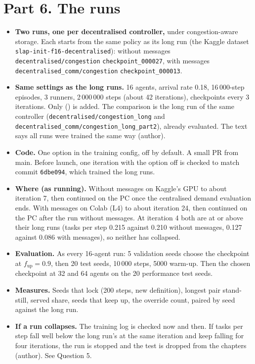 \documentclass[11pt,a4paper]{article}
\newcommand{\lab}[1]{\textsf{\footnotesize\detokenize{#1}}}
\renewcommand{\eqref}[1]{(\lab{#1})}
\begin{document}
\section*{Part 6. The runs}
\begin{itemize}[nosep]
  \item \textbf{Two runs, one per decentralised controller,} under
    congestion-aware storage. Each starts from the same policy as its long
    run (the Kaggle dataset \texttt{slap-init-f16-decentralised}):
    without messages \texttt{decentralised/congestion}
    \texttt{checkpoint\_000027}, with messages
    \texttt{decentralised\_comm/congestion} \texttt{checkpoint\_000013}.
  \item \textbf{Same settings as the long runs.} 16 agents, arrival rate 0.18,
    16\,000-step episodes, 3 runners, 2\,000\,000 steps (about 42
    iterations), checkpoints every 3 iterations. Only \eqref{eq:fleetreward}
    is added. The comparison is the long run of the same controller
    (\texttt{decentralised/congestion\_long} and
    \texttt{decentralised\_comm/congestion\_long\_part2}), already evaluated.
    The text says all runs were trained the same way (author).
  \item \textbf{Code.} One option in the training config, off by default. A
    small PR from main. Before launch, one iteration with the option off is
    checked to match commit \texttt{6dbe094}, which trained the long runs.
  \item \textbf{Where (as running).} Without messages on Kaggle's GPU to
    about iteration 7, then continued on the PC once the centralised demand
    evaluation ends. With messages on Colab (L4) to about iteration 24, then
    continued on the PC after the run without messages. At iteration 4 both
    are at or above their long runs (tasks per step 0.215 against 0.210
    without messages, 0.127 against 0.086 with messages), so neither has
    collapsed.
  \item \textbf{Evaluation.} As every 16-agent run: 5 validation seeds choose
    the checkpoint at $f_{\mathrm{up}} = 0.9$, then 20 test seeds, 10\,000
    steps, 5000 warm-up. Then the chosen checkpoint at 32 and 64 agents on the
    20 performance test seeds.
  \item \textbf{Measures.} Seeds that lock (200 steps, new definition),
    longest pair stand-still, served share, seeds that keep up, the override count, paired by seed
    against the long run.
  \item \textbf{If a run collapses.} The training log is checked now and then.
    If tasks per step fall well below the long run's at the same iteration
    and keep falling for four iterations, the run is stopped and the test is
    dropped from the chapters (author). See Question 5.
\end{itemize}
\end{document}
